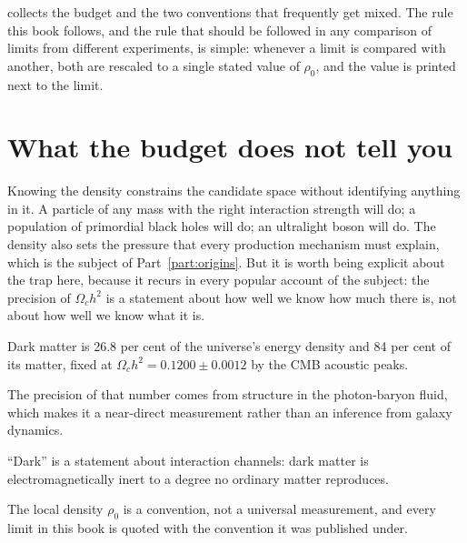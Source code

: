  collects the budget and the two conventions that
frequently get mixed. The rule this book follows, and the rule that should
be followed in any comparison of limits from different experiments, is simple:
whenever a limit is compared with another, both are rescaled to a single
stated value of $\rho_0$, and the value is printed next to the limit.

\section{What the budget does not tell you}Knowing the density constrains the candidate space without
identifying anything in it. A particle of any mass with the right
interaction strength will do; a population of primordial black holes will
do; an ultralight boson will do. The density also sets the pressure that
every production mechanism must explain, which is the subject of
Part~\ref{part:origins}. But it is worth being explicit about the trap here,
because it recurs in every popular account of the subject: the precision of
$\Omega_c h^2$ is a statement about how well we know how much there is, not
about how well we know what it is.

\begin{keytakeaways}
\item Dark matter is 26.8 per cent of the universe's energy density and
84 per cent of its matter, fixed at $\Omega_c h^2 = 0.1200 \pm 0.0012$ by
the CMB acoustic peaks.
\item The precision of that number comes from structure in the photon-baryon
fluid, which makes it a near-direct measurement rather than an inference from
galaxy dynamics.
\item ``Dark'' is a statement about interaction channels: dark matter is
electromagnetically inert to a degree no ordinary matter reproduces.
\item The local density $\rho_0$ is a convention, not a universal
measurement, and every limit in this book is quoted with the convention it
was published under.
\end{keytakeaways}
